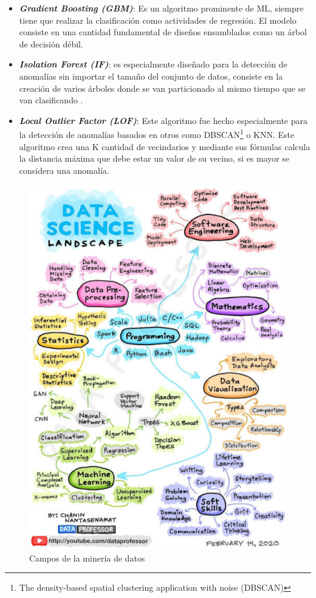 \begin{itemize}
  	\item \textit{\textbf{Gradient Boosting (GBM)}}: Es un algoritmo prominente de ML, siempre tiene que realizar la clasificaci\'{o}n como actividades de regresi\'{o}n. El modelo consiste en una cantidad fundamental de dise\~{n}os ensamblados como un \'{a}rbol de decisi\'{o}n d\'{e}bil.
  	\item \textit{\textbf{Isolation Forest (IF)}}: es especialmente dise\~{n}ado para la detecci\'{o}n de anomal\'{i}as sin importar el tama\~{n}o del conjunto de datos, consiste en la creaci\'{o}n de varios \'{a}rboles donde se van particionado al mismo tiempo que se van clasificando \cite{6}.
  	\item \textit{\textbf{Local Outlier Factor (LOF)}}: Este algoritmo fue hecho especialmente para la detecci\'{o}n de anomal\'{i}as basados en otros como DBSCAN\footnote{The density-based spatial clustering application with noise (DBSCAN)}  o KNN. Este algoritmo crea una K cantidad de vecindarios y mediante sus f\'{o}rmulas calcula la distancia m\'{a}xima que debe estar un valor de su vecino, si es mayor se considera una anomal\'{i}a.
  \end{itemize}

\begin{figure}[h!]
	\centering
	\includegraphics[height=0.9\textheight]{"figuras/Fig2"}
	\caption{Campos de la miner\'{i}a de datos}
\end{figure}


